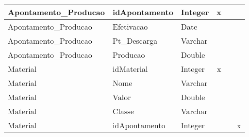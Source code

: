 \begin{table}[htbp]
\begin{tabular}{|l|l|l|c|c|c|}
Apontamento\_Producao & idApontamento & Integer & x &  &  \\ \hline
Apontamento\_Producao & Efetivacao & Date &  &  &  \\ \hline
Apontamento\_Producao & Pt\_Descarga & Varchar &  &  &  \\ \hline
Apontamento\_Producao & Producao & Double &  &  &  \\ \hline
Material & idMaterial & Integer & x &  &  \\ \hline
Material & Nome & Varchar &  &  &  \\ \hline
Material & Valor & Double &  &  &  \\ \hline
Material & Classe & Varchar &  &  &  \\ \hline
Material & idApontamento & Integer &  &  & x \\ \hline
\end{tabular}
\label{}
\end{table}
